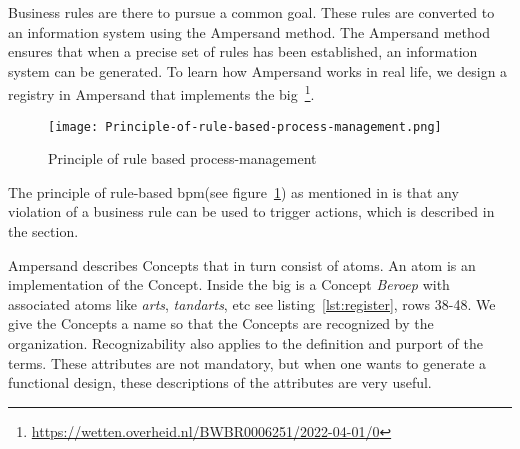 Business rules are there to pursue a common goal.
These rules are converted to an information system using the Ampersand method.
The Ampersand method ensures that when a precise set of rules has been established, an information system can be generated.
To learn how Ampersand works in real life, we design a registry in Ampersand that implements the \acrshort{big}~\footnote{\url{https://wetten.overheid.nl/BWBR0006251/2022-04-01/0}}.

\begin{figure}[!h]
\texttt{[image: Principle-of-rule-based-process-management.png]}
\caption{Principle of rule based process-management}
\label{fig:rule-based-proces}
\end{figure}
The principle of rule-based \acrfull{bpm}(see figure~\ref{fig:rule-based-proces}) as mentioned in  is that any violation of a business rule can be used to trigger actions, which is described in the  section.

Ampersand describes Concepts that in turn consist of atoms.
An atom is an implementation of the Concept.
Inside the \acrshort{big} is a Concept \textit{Beroep} with associated atoms like \textit{arts}, \textit{tandarts}, etc see listing~\ref{lst:register}, rows 38-48.
We give the Concepts a name so that the Concepts are recognized by the organization.
Recognizability also applies to the definition and purport of the terms.
These attributes are not mandatory, but when one wants to generate a functional design, these descriptions of the attributes are very useful.

